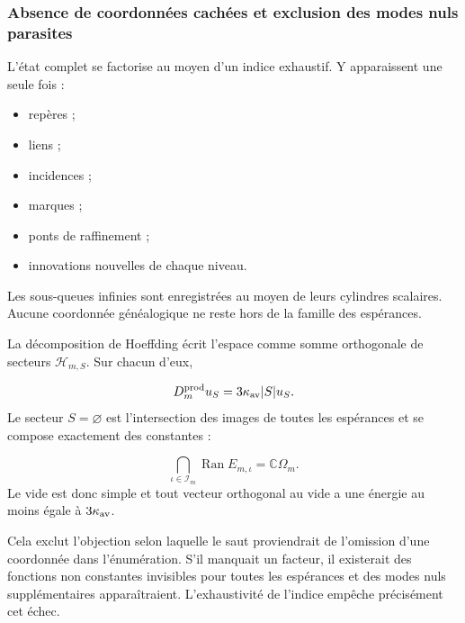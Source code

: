 \subsubsection{Absence de coordonnées cachées et exclusion des modes nuls parasites}
L’état complet se factorise au moyen d’un indice exhaustif. Y apparaissent une seule fois :\par
\begin{itemize}
\item repères ;
\item liens ;
\item incidences ;
\item marques ;
\item ponts de raffinement ;
\item innovations nouvelles de chaque niveau.
\end{itemize}
Les sous-queues infinies sont enregistrées au moyen de leurs cylindres scalaires. Aucune coordonnée généalogique ne reste hors de la famille des espérances.\par
La décomposition de Hoeffding écrit l’espace comme somme orthogonale de secteurs \(\mathcal H_{m,S}\). Sur chacun d’eux,\par
\[
D_m^{\rm prod}u_S
=
3\kappa_{\rm av}|S|u_S.
\]
Le secteur \(S=\varnothing\) est l’intersection des images de toutes les espérances et se compose exactement des constantes :\par
\[
\bigcap_{\iota\in\mathcal I_m}
\operatorname{Ran}E_{m,\iota}
=
\mathbb C\Omega_m.
\]
Le vide est donc simple et tout vecteur orthogonal au vide a une énergie au moins égale à \(3\kappa_{\rm av}\).\par
Cela exclut l’objection selon laquelle le saut proviendrait de l’omission d’une coordonnée dans l’énumération. S’il manquait un facteur, il existerait des fonctions non constantes invisibles pour toutes les espérances et des modes nuls supplémentaires apparaîtraient. L’exhaustivité de l’indice empêche précisément cet échec.\par
{}
